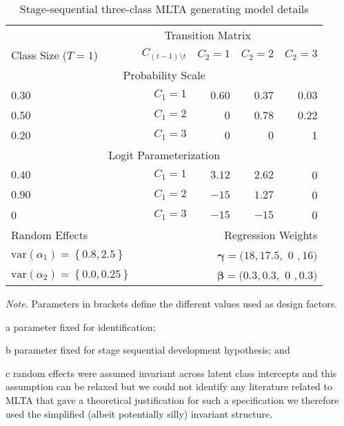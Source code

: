 \documentclass[man, noextraspace, floatsintext, 12pt]{apa7}
\begin{document}
\begin{table}[!htp]
\centering
\begin{threeparttable}
\caption{Stage-sequential three-class MLTA generating model details}
\label{tb:model-2}
\begin{tabular}{l r c r r r r}
\toprule
& & & \multicolumn{3}{c}{Transition Matrix}\\ \cmidrule(lr){4-7}
\multicolumn{2}{l}{Class Size ($T=1$)} & & $C_{(t-1)\setminus t}$ & $C_2 =1$ & $C_2 =2$ & $C_2 =3$   \\ \midrule
\multicolumn{7}{c}{Probability Scale}\\
 0.30 & & &  $C_1 =1$	& 0.60  & 0.37 & 0.03 \\
 0.50 & & &  $C_1 =2$	& 0\tnote{b}     & 0.78 & 0.22\\
 0.20 & & &  $C_1 =3$	&  0\tnote{b}     & 0\tnote{b}     & 1\\
\multicolumn{7}{c}{Logit Parameterization}\\
 $0.40$     & & & $C_1 =1$	&  $3.12$ &  $2.62$ & 0\tnote{a}\\
 $0.90$     & & & $C_1 =2$	& $-15$\tnote{b} &  $1.27$ & 0\tnote{a} \\
 0\tnote{a} & & & $C_1 =3$	& $-15$\tnote{b} &  $-15$\tnote{b} & 0\tnote{a} \\ \midrule
\multicolumn{3}{l}{Random Effects\tnote{c}} & &\multicolumn{3}{r}{Regression Weights}\\ 
\multicolumn{3}{l}{$\mathrm{var}(\alpha_1) = \left\lbrace 0.8, 2.5\right\rbrace$} & &\multicolumn{3}{r}{${\bm \gamma} = (18, 17.5,$ 0\tnote{b} $, 16)$}\\ 
\multicolumn{3}{l}{$\mathrm{var}(\alpha_2) = \left\lbrace 0.0, 0.25\right\rbrace$} & &\multicolumn{3}{r}{${\bm \beta} = (0.3, 0.3,$ 0\tnote{b} $, 0.3)$}\\
 \bottomrule
\end{tabular}
 \vspace*{1mm}
 	\begin{tablenotes}
    {\small
        \textit{Note.} Parameters in brackets define the different values used as design factors. \item[a]parameter fixed for identification; \item[b]parameter fixed for stage sequential development hypothesis; and \item[c]random effects were assumed invariant across latent class intercepts and this assumption can be relaxed but we could not identify any literature related to MLTA that gave a theoretical justification for such a specification we therefore used the simplified (albeit potentially silly) invariant structure.
    }
 	\end{tablenotes}
 \end{threeparttable}
\end{table}
\end{document}
